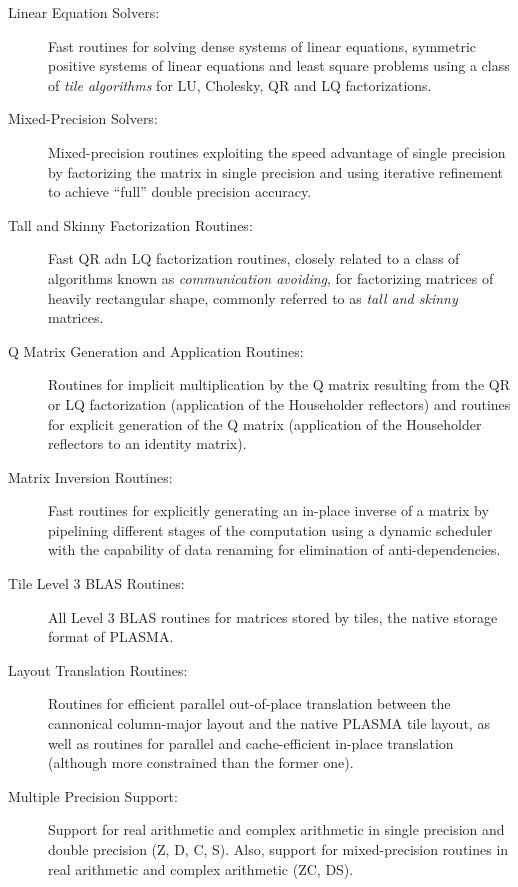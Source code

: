 \begin{description}
\item[Linear Equation Solvers:]
Fast routines for solving dense systems of linear equations, symmetric positive systems
of linear equations and least square problems using a class of {\em tile algorithms} for
LU, Cholesky, QR and LQ factorizations.

\item[\mbox{Mixed-Precision} Solvers:]
\mbox{Mixed-precision} routines exploiting the speed advantage of single precision
by factorizing the matrix in single precision and using iterative refinement to achieve
``full'' double precision accuracy.

\item[Tall and Skinny Factorization Routines:]
Fast QR adn LQ factorization routines, closely related to a class of algorithms known as
{\em communication avoiding}, for factorizing matrices of heavily rectangular shape,
commonly referred to as {\em tall and skinny} matrices.

\item[Q Matrix Generation and Application Routines:]
Routines for implicit multiplication by the Q matrix resulting from the QR or LQ factorization
(application of the Householder reflectors) and routines for explicit generation of the Q
matrix (application of the Householder reflectors to an identity matrix).

\item[Matrix Inversion Routines:]
Fast routines for explicitly generating an \mbox{in-place} inverse of a matrix by
pipelining different stages of the computation using a dynamic scheduler with the
capability of data renaming for elimination of \mbox{anti-dependencies}.

\item[Tile Level 3 BLAS Routines:]
All Level 3 BLAS routines for matrices stored by tiles, the native storage format of PLASMA.

\item[Layout Translation Routines:]
Routines for efficient parallel \mbox{out-of-place} translation between the cannonical
\mbox{column-major} layout and the native PLASMA tile layout, as well as routines for
parallel and \mbox{cache-efficient} \mbox{in-place} translation (although more constrained
than the former one).

\item[Multiple Precision Support:]
Support for real arithmetic and complex arithmetic in single precision and double precision
(Z, D, C, S). Also, support for \mbox{mixed-precision} routines in real arithmetic and complex
arithmetic (ZC, DS).


\end{description}
